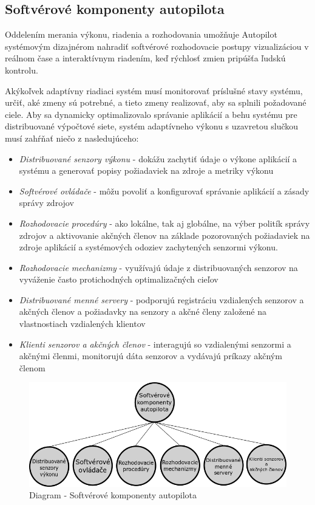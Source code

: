 \documentclass[10pt,twoside,slovak,a4paper]{article}
\begin{document}
\subsection{Softvérové komponenty autopilota}

Oddelením merania výkonu, riadenia a rozhodovania umožňuje Autopilot systémovým dizajnérom nahradiť softvérové rozhodovacie postupy vizualizáciou v reálnom čase a interaktívnym riadením, keď rýchlosť zmien pripúšťa ľudskú kontrolu.

Akýkoľvek adaptívny riadiaci systém musí monitorovať príslušné stavy systému, určiť, aké zmeny sú potrebné, a tieto zmeny realizovať, aby sa splnili požadované ciele. Aby sa dynamicky optimalizovalo správanie aplikácií a behu systému pre distribuované výpočtové siete, systém adaptívneho výkonu s uzavretou slučkou musí zahŕňať
niečo z nasledujúceho:

\begin{itemize}
\item \emph{Distribuované senzory výkonu} - dokážu zachytiť údaje o výkone aplikácií a systému a generovať popisy požiadaviek na zdroje a metriky výkonu
\item \emph{Softvérové ovládače} - môžu povoliť a konfigurovať správanie aplikácií a zásady správy zdrojov
\item \emph{Rozhodovacie procedúry} - ako lokálne, tak aj globálne, na výber politík správy zdrojov a aktivovanie akčných členov na základe pozorovaných požiadaviek na zdroje aplikácií a systémových odoziev zachytených senzormi výkonu.
\item \emph{Rozhodovacie mechanizmy} - využívajú údaje z distribuovaných senzorov na vyváženie často protichodných optimalizačných cieľov
\item \emph{Distribuované menné servery} - podporujú registráciu vzdialených senzorov a akčných členov a požiadavky na senzory a akčné členy založené na vlastnostiach vzdialených klientov
\item \emph{Klienti senzorov a akčných členov} - interagujú so vzdialenými senzormi a akčnými členmi, monitorujú dáta senzorov a vydávajú príkazy akčným členom \cite{SoftverAutopilot}
\end{itemize}

\begin{figure}[tbh]
\centering
\includegraphics[scale=0.40]{diagram.png}
\caption{Diagram - Softvérové komponenty autopilota\cite{SoftverAutopilot}}
\label{f:diagram}
\end{figure}
\end{document}
